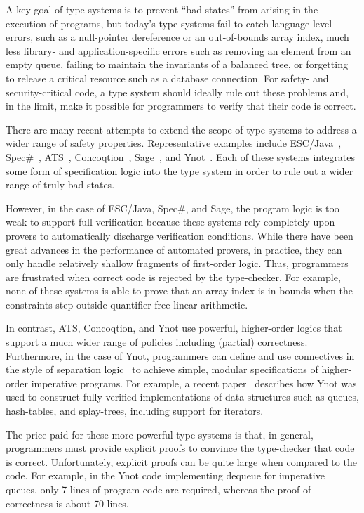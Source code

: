 \documentclass[preprint,nocopyrightspace]{sigplanconf}
\begin{document}
A key goal of type systems is to prevent ``bad states'' from arising
in the execution of programs, but today's type systems fail to catch
language-level errors, such as a null-pointer dereference or an
out-of-bounds array index, much less library- and application-specific
errors such as removing an element from an empty queue, failing to
maintain the invariants of a balanced tree, or forgetting to release a
critical resource such as a database connection.  For safety- and
security-critical code, a type system should ideally rule out these
problems and, in the limit, make it possible for programmers to verify
that their code is correct.

There are many recent attempts to extend the scope of type systems to
address a wider range of safety properties.  Representative examples
include ESC/Java~\cite{esc-java}, Spec\#~\cite{spec-sharp},
ATS~\cite{ats}, Concoqtion~\cite{concoqtion}, Sage~\cite{sage}, and
Ynot~\cite{ynot:icfp}.  Each of these systems integrates some form of
specification logic into the type system in order to rule out a wider
range of truly bad states.

However, in the case of ESC/Java, Spec\#, and Sage, the program logic
is too weak to support full verification because these systems rely
completely upon provers to automatically discharge verification conditions.
While there have been great advances in the performance of automated
provers, in practice, they can only handle relatively shallow
fragments of first-order logic.  Thus, programmers are frustrated when
correct code is rejected by the type-checker.  For example,
none of these systems is able to prove that an array index is in
bounds when the constraints step outside quantifier-free
linear arithmetic.

In contrast, ATS, Concoqtion, and Ynot use powerful, higher-order
logics that support a much wider range of policies including (partial)
correctness.  Furthermore, in the case of Ynot, programmers can define
and use connectives in the style of separation logic~\cite{separation}
to achieve simple, modular specifications of higher-order imperative
programs.  For example, a recent paper~\cite{ynot:icfp} describes how Ynot was used
to construct fully-verified implementations of data structures such
as queues, hash-tables, and splay-trees, including support for 
iterators.  

The price paid for these more powerful type systems is that, in
general, programmers must provide explicit proofs to convince the
type-checker that code is correct.  Unfortunately, explicit proofs can
be quite large when compared to the code.  For example, in the Ynot
code implementing dequeue for imperative queues, only 7 lines of
program code are required, whereas the proof of correctness is about
70 lines.
\end{document}
